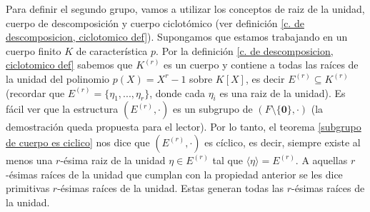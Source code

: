 \documentclass[10pt]{article}
\newcommand{\0}{\mathbf{0}}
\newcommand{\1}{\mathbf{1}}
\newcommand{\+}{\oplus}
\newcommand{\comentario}[1]{}
\newcommand{\comentarioin}[1]{}
\theoremstyle{remark}
\theoremstyle{remark}
\newcommand{\tq}{\mid}
\begin{document}
	Para definir el segundo grupo, vamos a utilizar los conceptos de raiz de la unidad, cuerpo de descomposición y cuerpo ciclotómico (ver definición \ref{c. de descomposicion, ciclotomico def}).
Supongamos que estamos trabajando en un cuerpo finito $K$ de caracterí­stica $p$. Por la definición \ref{c. de descomposicion, ciclotomico def} sabemos que $K^{(r)}$ es un cuerpo y contiene a todas las raíces de la unidad del polinomio $p(X)=X^r-1$ sobre $K[X]$, es decir $E^{(r)}\subseteq K^{(r)}$ (recordar que $E^{(r)}=\{\eta_1,...,\eta_r\}$, donde cada $\eta_i$ es una raiz de la unidad).\comentarioin{este conjunto tiene $r$ elementos? contando cada raiz de multiplicidad mayor que uno como elementos distintos}
Es fácil ver que la estructura $(E^{(r)},\cdot)$ es un subgrupo de $(F\setminus \{\0\},\cdot)$ (la demostración queda propuesta para el lector). Por lo tanto, el teorema \ref{subgrupo de cuerpo es ciclico} nos dice que $(E^{(r)},\cdot)$ es cíclico, es decir, siempre existe al menos una $r$-ésima raiz de la unidad $\eta\in E^{(r)}$ tal que $\langle\eta\rangle = E^{(r)}$. A aquellas $r$-ésimas raíces de la unidad que cumplan con la propiedad anterior se les dice primitivas $r$-ésimas raíces de la unidad. Estas generan todas las $r$-ésimas raíces de la unidad.
\end{document}
